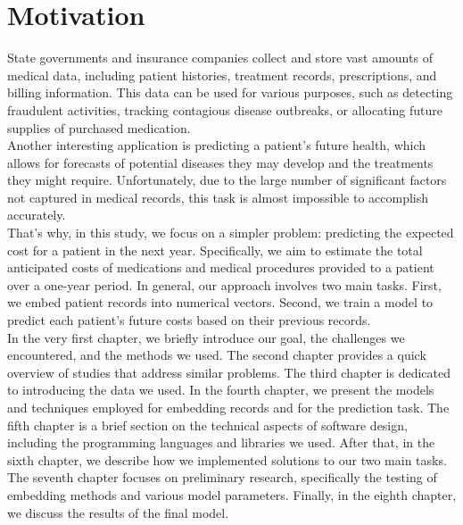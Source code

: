 
\chapter*{Motivation}

State governments and insurance companies collect and store vast amounts of medical data, including patient histories, treatment records, prescriptions, and billing information. This data can be used for various purposes, such as detecting fraudulent activities, tracking contagious disease outbreaks, or allocating future supplies of purchased medication.
\\

Another interesting application is predicting a patient's future health, which allows for forecasts of potential diseases they may develop and the treatments they might require. Unfortunately, due to the large number of significant factors not captured in medical records, this task is almost impossible to accomplish accurately.
\\

That's why, in this study, we focus on a simpler problem: predicting the expected cost for a patient in the next year. Specifically, we aim to estimate the total anticipated costs of medications and medical procedures provided to a patient over a one-year period. In general, our approach involves two main tasks. First, we embed patient records into numerical vectors. Second, we train a model to predict each patient’s future costs based on their previous records.
\\

In the very first chapter, we briefly introduce our goal, the challenges we encountered, and the methods we used. The second chapter provides a quick overview of studies that address similar problems. The third chapter is dedicated to introducing the data we used. In the fourth chapter, we present the models and techniques employed for embedding records and for the prediction task. The fifth chapter is a brief section on the technical aspects of software design, including the programming languages and libraries we used. After that, in the sixth chapter, we describe how we implemented solutions to our two main tasks. The seventh chapter focuses on preliminary research, specifically the testing of embedding methods and various model parameters. Finally, in the eighth chapter, we discuss the results of the final model.